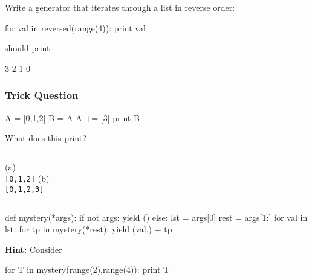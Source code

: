 \begin{frame}[fragile]
Write a \alert{generator} that iterates through a list in \alert{reverse} order:

\begin{python}
for val in reversed(range(4)):
    print val
\end{python}
should print

\begin{python}
3
2
1
0
\end{python}
\end{frame}

\begin{frame}[fragile]
\frametitle{Trick Question}

\begin{python}
A = [0,1,2]
B = A
A += [3]
print B
\end{python}

What does this print?

\begin{columns}
(a)\\
\verb+[0,1,2]+
(b)\\
\verb+[0,1,2,3]+
\end{columns}
\end{frame}

\begin{frame}[fragile]
\begin{python}
def mystery(*args):
    if not args:
        yield ()
    else:
        lst = args[0]
        rest = args[1:]
        for val in lst:
            for tp in mystery(*rest):
                yield (val,) + tp
\end{python}

\pause

\textbf{Hint:} Consider

\begin{python}
for T in mystery(range(2),range(4)):
    print T
\end{python}
\end{frame}

